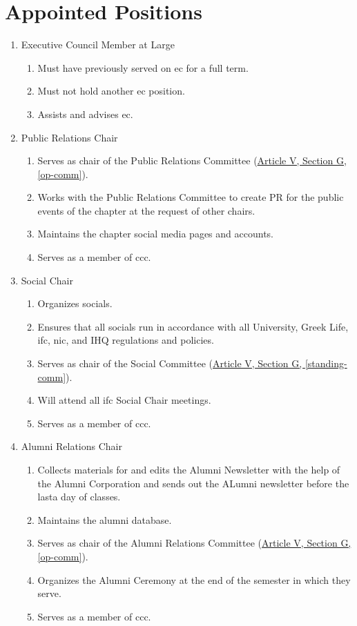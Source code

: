 \section{Appointed Positions}
	\begin{enumerate}
                \item Executive Council Member at Large
			\begin{enumerate}
				\item Must have previously served on \gls{ec} for a full term.
				\item Must not hold another \gls{ec} position.
				\item Assists and advises \gls{ec}.
			\end{enumerate}

		\item Public Relations Chair
			\begin{enumerate}
				\item Serves as chair of the Public Relations Committee (\hyperref[op-comm]{Article V, Section G, \autoref*{op-comm}}).
				\item Works with the Public Relations Committee to create PR for the public events of the chapter at the request of other chairs.
				\item Maintains the chapter social media pages and accounts.
				\item Serves as a member of \gls{ccc}.
			\end{enumerate}

		\item Social Chair
			\begin{enumerate}
				\item Organizes \glspl{social}.
				\item Ensures that all \glspl{social} run in accordance with all University, Greek Life, \gls{ifc}, \gls{nic}, and IHQ regulations and policies.
				\item Serves as chair of the Social Committee (\hyperref[standing-comm]{Article V, Section G, \autoref*{standing-comm}}).
				\item Will attend all \gls{ifc} Social Chair meetings.
				\item Serves as a member of \gls{ccc}.
			\end{enumerate}

		\item Alumni Relations Chair
			\begin{enumerate}
				\item Collects materials for and edits the Alumni Newsletter with the help of the Alumni Corporation and sends out the ALumni newsletter before the lasta day of classes.
				\item Maintains the alumni database.
				\item Serves as chair of the Alumni Relations Committee (\hyperref[op-comm]{Article V, Section G, \autoref*{op-comm}}).
				\item Organizes the Alumni Ceremony at the end of the semester in which they serve.
				\item Serves as a member of \gls{ccc}.
			\end{enumerate}


\end{enumerate}
